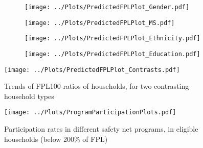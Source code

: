 \begin{figure}[H]
\centering
\caption{Trends of FPL100-ratios, for households with a working age adult with disability (a) by gender (b) by marital status (c) by race and ethnicity (d) by education, of reference person}
\begin{subfigure}{0.49\linewidth}
\texttt{[image: ../Plots/PredictedFPLPlot\_Gender.pdf]}
\caption{}
\label{fig:disab_gender}
\end{subfigure}
\begin{subfigure}{0.49\linewidth}
\texttt{[image: ../Plots/PredictedFPLPlot\_MS.pdf]} 
\caption{}
\label{fig:disab_MS} 
\end{subfigure}
\newline
\begin{subfigure}{0.49\linewidth}
\texttt{[image: ../Plots/PredictedFPLPlot\_Ethnicity.pdf]}
\caption{}
\label{fig:disab_race}
\end{subfigure}
\begin{subfigure}{0.49\linewidth}
\texttt{[image: ../Plots/PredictedFPLPlot\_Education.pdf]}
\caption{}
\label{fig:disab_education}
\end{subfigure}
\label{fig:Disab_Demographics}
\end{figure}

\begin{figure}[H]
\caption{Trends of FPL100-ratios of households, for two contrasting household types}
\centering
\texttt{[image: ../Plots/PredictedFPLPlot\_Contrasts.pdf]}
\label{fig:contrasts}
\end{figure}

\begin{figure}[H]
\caption{Participation rates in different safety net programs, in eligible households (below 200\% of FPL)}
\centering
\texttt{[image: ../Plots/ProgramParticipationPlots.pdf]}
\label{fig:programParticipation}
\end{figure}

